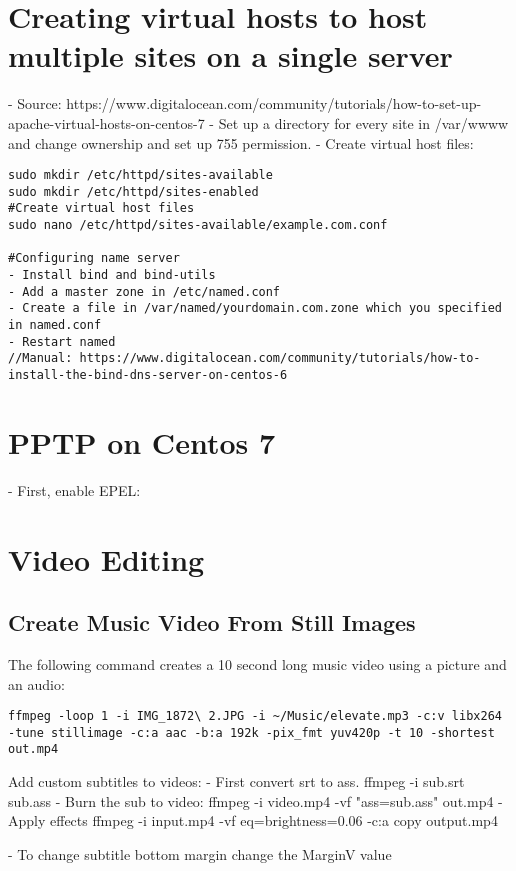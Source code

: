 \documentclass{article}
\begin{document}
\section{Creating virtual hosts to host multiple sites on a single server}
- Source: https://www.digitalocean.com/community/tutorials/how-to-set-up-apache-virtual-hosts-on-centos-7
- Set up a directory for every site in /var/wwww and change ownership and set up 755 permission.
- Create virtual host files:
\begin{verbatim}
sudo mkdir /etc/httpd/sites-available
sudo mkdir /etc/httpd/sites-enabled
#Create virtual host files
sudo nano /etc/httpd/sites-available/example.com.conf

#Configuring name server
- Install bind and bind-utils
- Add a master zone in /etc/named.conf
- Create a file in /var/named/yourdomain.com.zone which you specified in named.conf
- Restart named
//Manual: https://www.digitalocean.com/community/tutorials/how-to-install-the-bind-dns-server-on-centos-6

\end{verbatim}


\section{PPTP on Centos 7}
- First, enable EPEL:

\section{Video Editing}

\subsection{Create Music Video From Still Images}
The following command creates a 10 second long music video using a picture and an audio:
\begin{verbatim}
ffmpeg -loop 1 -i IMG_1872\ 2.JPG -i ~/Music/elevate.mp3 -c:v libx264 -tune stillimage -c:a aac -b:a 192k -pix_fmt yuv420p -t 10 -shortest out.mp4

\end{verbatim}

Add custom subtitles to videos:
- First convert srt to ass.
ffmpeg -i sub.srt sub.ass
- Burn the sub to video:
ffmpeg -i video.mp4 -vf "ass=sub.ass" out.mp4
- Apply effects
ffmpeg -i input.mp4 -vf eq=brightness=0.06 -c:a copy output.mp4

- To change subtitle bottom margin change the MarginV value
\end{document}
